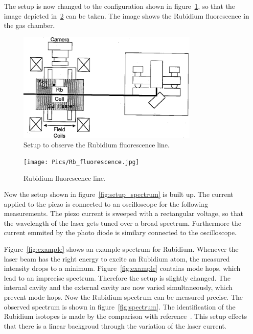 The setup is now changed to the configuration shown in figure~\ref{fig:setup_fluorescence},
so that the image depicted in~\ref{fig:fluorescence} can be taken. The image
shows the Rubidium fluorescence in the gas chamber.

\begin{figure}
  \centering
  \includegraphics[width=0.8\textwidth]{Pics/setup_fluorescence.png}
  \caption{Setup to observe the Rubidium fluorescence line.\cite{anleitung}}
  \label{fig:setup_fluorescence}
\end{figure}

\begin{figure}
  \centering
  \texttt{[image: Pics/Rb\_fluorescence.jpg]}
  \caption{Rubidium fluorescence line.}
  \label{fig:fluorescence}
\end{figure}

\FloatBarrier
Now the setup shown in figure~\ref{fig:setup_spectrum} is built up.
The current applied to the piezo is connected to an oscilloscope
for the following measurements. The piezo current is sweeped with a rectangular
voltage, so that the wavelength of the laser gets tuned over a broad spectrum.
Furthermore the current emmited by the photo diode is similary connected to the oscilloscope.

Figure~\ref{fig:example} shows an example spectrum for Rubidium. Whenever
the laser beam has the right energy to excite an Rubidium atom, the
measured intensity drops to a minimum. Figure~\ref{fig:example} contains
mode hops, which lead to an imprecise spectrum.
Therefore the setup is slightly changed. The internal cavity and the external cavity
are now varied simultaneously, which prevent mode hops.
Now the Rubidium spectrum can be measured precise. The observed spectrum
is shown in figure~\ref{fig:spectrum}. The identification of the Rubidium isotopes
is made by the comparison with reference~\cite{anleitung}.
This setup effects that there is a linear backgroud through the variation
of the laser current.

